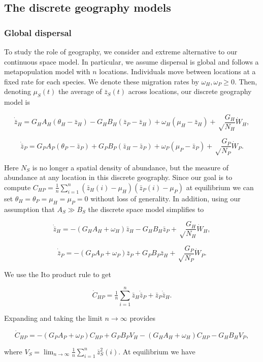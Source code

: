 \documentclass{article}
\begin{document}
\hypertarget{the-discrete-geography-models}{%
\subsection{The discrete geography
models}\label{the-discrete-geography-models}}

\hypertarget{global-dispersal}{%
\subsubsection{Global dispersal}\label{global-dispersal}}

To study the role of geography, we consider and extreme alternative to
our continuous space model. In particular, we assume dispersal is global
and follows a metapopulation model with \(n\) locations. Individuals
move between locations at a fixed rate for each species. We denote these
migration rates by \(\omega_H,\omega_P\geq0\). Then, denoting
\(\mu_S(t)\) the average of \(\bar z_S(t)\) across locations, our
discrete geography model is

\[\dot{\bar z}_H=G_HA_H(\theta_H-\bar z_H)-G_HB_H(\bar z_P-\bar z_H)+\omega_H(\mu_H-\bar z_H)+\sqrt\frac{G_H}{N_H}\dot W_H,\]

\[\dot{\bar z}_P=G_PA_P(\theta_P-\bar z_P)+G_PB_P(\bar z_H-\bar z_P)+\omega_P(\mu_P-\bar z_P)+\sqrt\frac{G_P}{N_P}\dot W_P.\]

Here \(N_S\) is no longer a spatial density of abundance, but the
measure of abundance at any location in this discrete geography. Since
our goal is to compute
\(C_{HP}=\tfrac{1}{n}\sum_{i=1}^n(\bar z_H(i)-\mu_H)(\bar z_P(i)-\mu_P)\)
at equilibrium we can set \(\theta_H=\theta_P=\mu_H=\mu_P=0\) without
loss of generality. In addition, using our assumption that
\(A_S\gg B_S\) the discrete space model simplifies to

\[\dot{\bar z}_H=-(G_HA_H+\omega_H)\bar z_H-G_HB_H\bar z_P+\sqrt\frac{G_H}{N_H}\dot W_H,\]

\[\dot{\bar z}_P=-(G_PA_P+\omega_P)\bar z_P+G_PB_P\bar z_H+\sqrt\frac{G_P}{N_P}\dot W_P.\]

We use the Ito product rule to get

\[\dot C_{HP}=\tfrac{1}{n}\sum_{i=1}^n\bar z_H\dot{\bar z}_P+\bar z_P\dot{\bar z}_H.\]

Expanding and taking the limit \(n\to\infty\) provides

\[\dot C_{HP}=-(G_PA_P+\omega_P)C_{HP}+G_PB_PV_H-(G_HA_H+\omega_H)C_{HP}-G_HB_HV_P,\]

where \(V_S=\lim_{n\to\infty}\tfrac{1}{n}\sum_{i=1}^n\bar z_S^2(i)\). At
equilibrium we have
\end{document}
